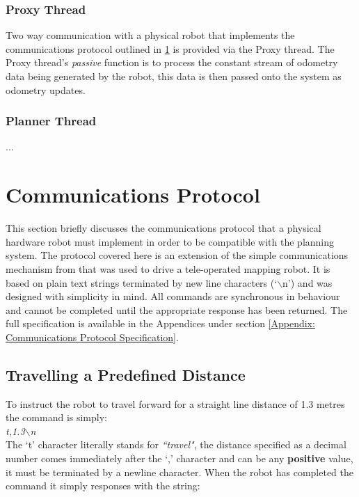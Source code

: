 \subsubsection*{Proxy Thread}
\noindent
Two way communication with a physical robot that implements the communications protocol outlined in \ref{sec:protocol} is provided via the Proxy thread. The Proxy thread's \textit{passive} function is to process the constant stream of odometry data being generated by the robot, this data is then passed onto the system as odometry updates. 

\subsubsection*{Planner Thread}
\noindent
...

\newpage


\section{Communications Protocol}\label{sec:protocol}
\noindent
This section briefly discusses the communications protocol that a physical hardware robot must implement in order to be compatible with the planning system. The protocol covered here is an extension of the simple communications mechanism from \cite{JMD14} that was used to drive a tele-operated mapping robot. It is based on plain text strings terminated by new line characters (`$\backslash$n') and was designed with simplicity in mind. All commands are synchronous in behaviour and cannot be completed until the appropriate response has been returned. The full specification is available in the Appendices under section \ref{Appendix: Communications Protocol Specification}.

\subsection{Travelling a Predefined Distance}
\noindent
To instruct the robot to travel forward for a straight line distance of 1.3 metres the command is simply: \\

\textit{t,1.3$\backslash$n} \\

\noindent
The `t' character literally stands for \textit{``travel"}, the distance specified as a decimal number comes immediately after the `,' character and can be any \textbf{positive} value, it must be terminated by a newline character. When the robot has completed the command it simply responses with the string: \\

